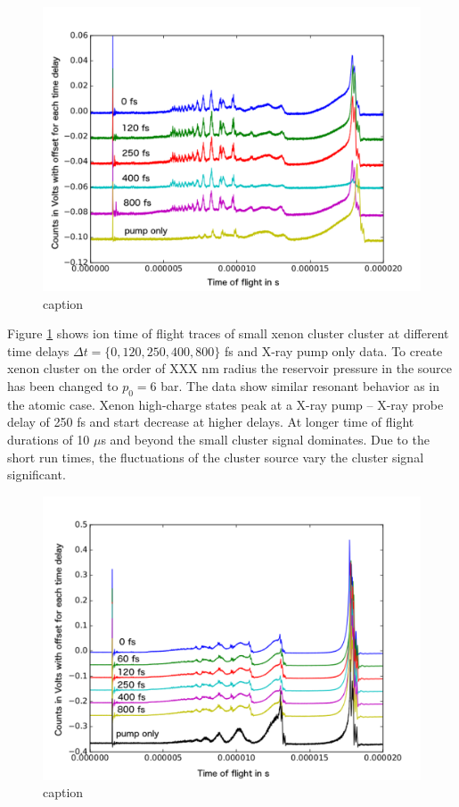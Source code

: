 \begin{figure}
	\centering
		\includegraphics[width=1.00\textwidth]{images/results/TOF-small-cluster-xenon.png}
	\caption{caption}
	\label{fig:TOF-small-cluster-xenon}
\end{figure}
Figure \ref{fig:TOF-small-cluster-xenon} shows ion time of flight traces of small xenon cluster cluster at different time delays $\Delta t = \{0,120,250,400,800\}$ fs and X-ray pump only data. To create xenon cluster on the order of XXX nm radius the reservoir pressure in the source has been changed to $p_{0}=6$ bar. The data show similar resonant behavior as in the atomic case. Xenon high-charge states peak at a X-ray pump -- X-ray probe delay of 250 fs and start decrease at higher delays. At longer time of flight durations of 10 $\mu$s and beyond the small cluster signal dominates. Due to the short run times, the fluctuations of the cluster source vary the cluster signal significant.\\
\begin{figure}
	\centering
		\includegraphics[width=1.00\textwidth]{images/results/TOF-regular-cluster-xenon.png}
	\caption{caption}
	\label{fig:TOF-regular-cluster-xenon}
\end{figure}
